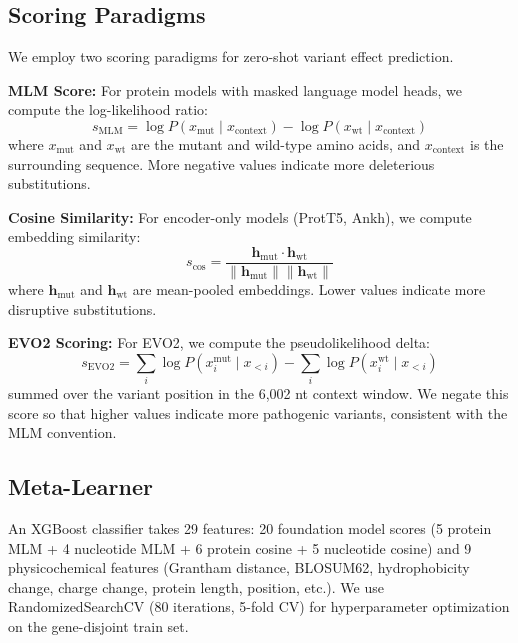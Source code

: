 \documentclass[9pt]{article}
\begin{document}
\subsection{Scoring Paradigms}

We employ two scoring paradigms for zero-shot variant effect prediction.

\textbf{MLM Score:} For protein models with masked language model heads, we compute the log-likelihood ratio:
\begin{equation}
    s_{\text{MLM}} = \log P(x_{\text{mut}} \mid x_{\text{context}}) - \log P(x_{\text{wt}} \mid x_{\text{context}})
    \label{eq:mlm}
\end{equation}
where $x_{\text{mut}}$ and $x_{\text{wt}}$ are the mutant and wild-type amino acids, and $x_{\text{context}}$ is the surrounding sequence. More negative values indicate more deleterious substitutions.

\textbf{Cosine Similarity:} For encoder-only models (ProtT5, Ankh), we compute embedding similarity:
\begin{equation}
    s_{\text{cos}} = \frac{\mathbf{h}_{\text{mut}} \cdot \mathbf{h}_{\text{wt}}}{\|\mathbf{h}_{\text{mut}}\| \|\mathbf{h}_{\text{wt}}\|}
    \label{eq:cosine}
\end{equation}
where $\mathbf{h}_{\text{mut}}$ and $\mathbf{h}_{\text{wt}}$ are mean-pooled embeddings. Lower values indicate more disruptive substitutions.

\textbf{EVO2 Scoring:} For EVO2, we compute the pseudolikelihood delta:
\begin{equation}
    s_{\text{EVO2}} = \sum_{i} \log P(x_i^{\text{mut}} \mid x_{<i}) - \sum_{i} \log P(x_i^{\text{wt}} \mid x_{<i})
    \label{eq:evo2}
\end{equation}
summed over the variant position in the 6,002 nt context window. We negate this score so that higher values indicate more pathogenic variants, consistent with the MLM convention.

\subsection{Meta-Learner}

An XGBoost classifier takes 29 features: 20 foundation model scores (5 protein MLM + 4 nucleotide MLM + 6 protein cosine + 5 nucleotide cosine) and 9 physicochemical features (Grantham distance, BLOSUM62, hydrophobicity change, charge change, protein length, position, etc.). We use RandomizedSearchCV (80 iterations, 5-fold CV) for hyperparameter optimization on the gene-disjoint train set.
\end{document}
